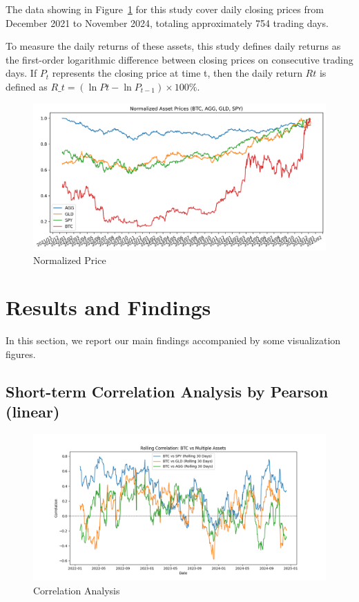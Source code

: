 \documentclass{article}
\begin{document}
The data showing in Figure~\ref{price}  for this study cover daily closing prices from December 2021 to November 2024, totaling approximately 754 trading days.

To measure the daily returns of these assets, this study defines daily returns as the first-order logarithmic difference between closing prices on consecutive trading days. If $P_t$  represents the closing price at time t, then the daily return $Rt$ is defined as $R\_t = (\ln Pt - \ln P_{t-1}) \times 100\%$. 

\begin{figure}
    \centering
    \includegraphics[width=1\linewidth]{figure/normalized_asset_prices.png}
    \caption{Normalized Price}
    \label{price}
\end{figure}


\section{Results and Findings}





In this section, we report our main findings accompanied by some visualization figures.

\subsection{Short-term Correlation Analysis by Pearson (linear)}



\begin{figure}
    \centering
    \includegraphics[width=1\linewidth]{figure/rolling_correlation_multi.png}
    \caption{Correlation Analysis}
    \label{volatility}
\end{figure}
\end{document}
